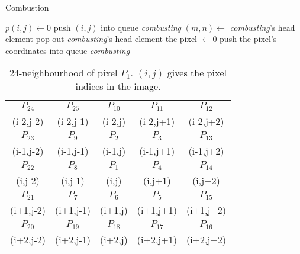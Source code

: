 
\begin{algorithm}
    \caption{Combustion}
    \label{alg:comb}
    \begin{algorithmic}
    
    \State $p(i,j) \gets 0$
    \State push $(i,j)$ into queue \textit{combusting}
        \State $(m,n) \gets$ \textit{combusting}'s head element
        \State pop out \textit{combusting}'s head element
                \State the pixel $\gets 0$
                \State push the pixel's coordinates into queue \textit{combusting}
            \EndIf
        \EndFor
    \EndWhile
    \end{algorithmic}
\end{algorithm}


\begin{table}[H]
\centering
\caption{24-neighbourhood of pixel $P_1$. $(i,j)$ gives the pixel indices in the image.}
\label{tab:method/comb}
\begin{tabular}{|c|c|c|c|c|}
\hline
$P_{24}$ & $P_{25}$ & $P_{10}$ & $P_{11}$ & $P_{12}$ \\
(i-2,j-2) & (i-2,j-1) & (i-2,j)   & (i-2,j+1) & (i-2,j+2) \\ \hline
$P_{23}$ & $P_{9}$  & $P_{2}$  & $P_{3}$  & $P_{13}$ \\
(i-1,j-2) & (i-1,j-1) & (i-1,j)   & (i-1,j+1) & (i-1,j+2) \\ \hline
$P_{22}$ & $P_{8}$  & $P_{1}$  & $P_{4}$  & $P_{14}$ \\
(i,j-2)   & (i,j-1)   & (i,j)     & (i,j+1)   & (i,j+2)   \\ \hline
$P_{21}$ & $P_{7}$  & $P_{6}$  & $P_{5}$  & $P_{15}$ \\
(i+1,j-2) & (i+1,j-1) & (i+1,j)   & (i+1,j+1) & (i+1,j+2) \\ \hline
$P_{20}$ & $P_{19}$ & $P_{18}$ & $P_{17}$ & $P_{16}$ \\
(i+2,j-2) & (i+2,j-1) & (i+2,j)   & (i+2,j+1) & (i+2,j+2) \\ \hline
\end{tabular}
\end{table}
